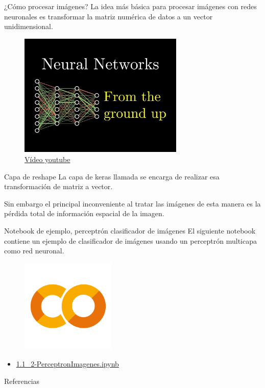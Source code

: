 \begin{frame}{¿Cómo procesar imágenes?}
La idea más \alert{básica} para procesar imágenes con redes neuronales es  transformar la \alert{matriz numérica} de datos a un \alert{vector unidimensional}.

\begin{figure}
    \centering
    \includegraphics[width=0.7\textwidth]{figures/Tema 3/NNVideo.jpg}
    \caption{\href{https://www.youtube.com/watch?v=aircAruvnKk&t=218s}{Vídeo youtube}}
\end{figure}
\end{frame}

\begin{frame}{Capa de reshape}
La capa de \alert{keras} llamada  se encarga de realizar esa transformación de \alert{matriz} a \alert{vector}.

Sin embargo el principal \alert{inconveniente} al tratar las imágenes de esta manera es la \alert{pérdida total} de información espacial de la imagen.
\end{frame}


\begin{frame}{Notebook de ejemplo, perceptrón clasificador de imágenes}
El siguiente notebook contiene un ejemplo de clasificador de imágenes usando un perceptrón multicapa como red neuronal.

\begin{figure}
    \centering
    \includegraphics[width=0.4\textwidth]{figures/GoogleColab.png}
\end{figure}
\begin{itemize}
    \centering
    \item {\Large \href{https://colab.research.google.com/drive/1h2cas9zCyUsutVJrJwR43zJMzOurunoV?usp=sharing}{1.1\_2-PerceptronImagenes.ipynb}}
\end{itemize}
\end{frame}

\begin{frame}[allowframebreaks]{Referencias}
    
    
\end{frame}

